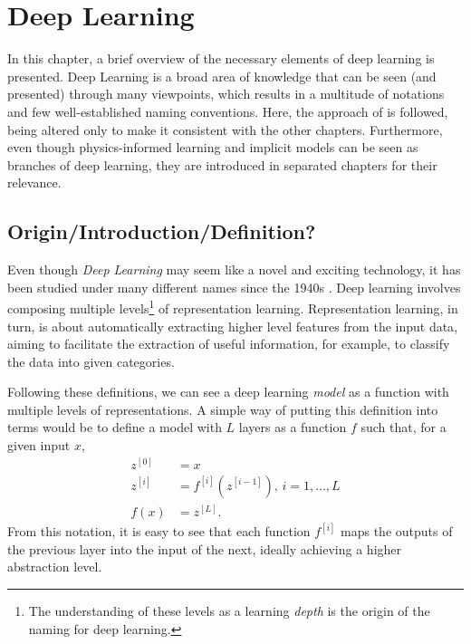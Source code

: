 \chapter{Deep Learning}\label{ch:deep-learning}

In this chapter, a brief overview of the necessary elements of deep learning is presented.
Deep Learning is a broad area of knowledge that can be seen (and presented) through many viewpoints, which results in a multitude of notations and few well-established naming conventions.
Here, the approach of \textcite{goodfellow_deep_2016} is followed, being altered only to make it consistent with the other chapters.
Furthermore, even though physics-informed learning and implicit models can be seen as branches of deep learning, they are introduced in separated chapters for their relevance.

\section{Origin/Introduction/Definition?}

Even though \textit{Deep Learning} may seem like a novel and exciting technology, it has been studied under many different names since the 1940s \cite{goodfellow_deep_2016}.
Deep learning involves composing multiple levels\footnote{The understanding of these levels as a learning \textit{depth} is the origin of the naming for deep learning.} of representation learning.
Representation learning, in turn, is about automatically extracting higher level features from the input data\cite{lecun_deep_2015,bengio_representation_2013}, aiming to facilitate the extraction of useful information, for example, to classify the data into given categories.

Following these definitions, we can see a deep learning \textit{model} as a function with multiple levels of representations.
A simple way of putting this definition into terms would be to define a model with $L$ layers as a function $f$ such that, for a given input $x$,
\begin{align*}
    z^{[0]} &= x \\
    z^{[i]} &= f^{[i]}(z^{[i-1]}),\,i=1,\ldots,L \\
    f(x) &= z^{[L]}
.\end{align*}
From this notation, it is easy to see that each function $f^{[i]}$ maps the outputs of the previous layer into the input of the next, ideally achieving a higher abstraction level.

